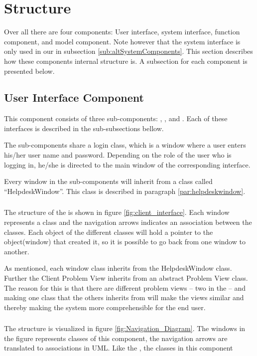 \section{Structure}
Over all there are four components: User interface, system interface, function component, and model component.
Note however that the system interface is only used in our  in subsection \ref{sub:altSystemComponents}.
This section describes how these components internal structure is.
A subsection for each component is presented below.

\subsection{User Interface Component}
This component consists of three sub-components: \cinterface[], \sinterface[], and \ainterface[].
Each of these interfaces is described in the sub-subsections bellow.

The sub-components share a login class, which is a window where a user enters his/her user name and password.
Depending on the role of the user who is logging in, he/she is directed to the main window of the corresponding interface.

Every window in the sub-components will inherit from a class called ``HelpdeskWindow''.
This class is described in paragraph \ref{par:helpdeskwindow}.

\subsubsection{\cinterface[]}
The structure of the \cinterface[] is shown in figure \ref{fig:client_interface}.
Each window represents a class and the navigation arrows indicates an association between the classes.
Each object of the different classes will hold a pointer to the object(window) that created it, so it is possible to go back from one window to another.

As mentioned, each window class inherits from the HelpdeskWindow class.
Further the Client Problem View inherits from an abstract Problem View class. The reason for this is that there are different problem views -- two in the \sinterface[] -- and making one class that the others inherits from will make the views similar and thereby making the system more comprehensible for the end user.

\subsubsection{\sinterface[]}
The \sinterface[] structure is visualized in figure \ref{fig:Navigation_Diagram}.
The windows in the figure represents classes of this component, the navigation arrows are translated to associations in UML.
Like the \cinterface[], the classes in this component

